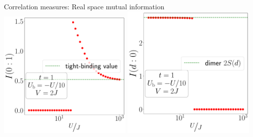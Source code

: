 \documentclass[aspectratio=169]{beamer}
\begin{document}
\begin{frame}[noframenumbering]{Correlation measures: Real space mutual information}
\vspace*{20pt}
\includegraphics[width=0.49\textwidth]{./figures/mi-01-t=1.000,J=10.000,0.000,40,V=3J,Ubath=-U_by_10,N=4,U=1.000,1000.000,40.pdf}
\includegraphics[width=0.49\textwidth]{./figures/mi-d0-t=1.000,J=10.000,0.000,40,V=3J,Ubath=-U_by_10,N=4,U=1.000,1000.000,40.pdf}
\end{frame}
\end{document}
